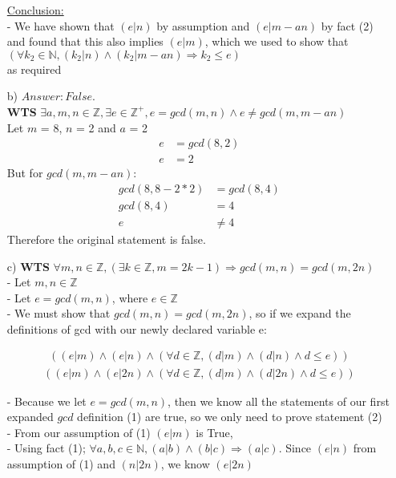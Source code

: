 \documentclass[20pt]{article}
\begin{document}
\begin{enumerate}
\underline{Conclusion:}\\
- We have shown that $(e|n)$ by assumption and $(e|m-an)$ by fact (2) and found that this also implies $(e|m)$, which we used to show that $(\forall k_2 \in\mathbb{N}, (k_2|n)\land(k_2|m-an)\Rightarrow k_2 \leq e)$ \\
as required \hfill \Box



\item[b)] $Answer: False.$\\ 
\textbf{WTS} $\exists a,m,n \in\mathbb{Z}, \exists e \in\mathbb{Z}^+, e = gcd(m,n) \land e \neq gcd(m,m-an)$ \\
Let $m$ = 8, $n$ = 2 and $a$ = 2\\
\begin{align}
    e &= gcd(8,2) \nonumber\\
    e &= 2 \nonumber
\end{align}
But for $gcd(m,m-an)$:
\begin{align}
    gcd(8,8-2*2) &= gcd(8,4)\nonumber\\
    gcd(8,4) &= 4 \nonumber\\
    e &\neq 4 \nonumber
\end{align}
Therefore the original statement is false.

\newpage
\item[c)] \textbf{WTS} $\forall m,n \in\mathbb{Z},(\exists k \in\mathbb{Z}, m = 2k-1) \Rightarrow gcd(m,n) = gcd(m,2n)$\\
- Let $m,n \in\mathbb{Z}$\\
- Let $e = gcd(m,n)$, where $e\in\mathbb{Z}$\\
- We must show that $gcd(m,n) = gcd(m,2n)$, so if we expand the definitions of gcd with our newly declared variable e:

\begin{align}
    ((e|m)\land(e|n)\land(\forall d\in\mathbb{Z},(d|m)\land(d|n)\land d\leq e)) \tag{1}
\end{align}
\begin{align}
    ((e|m)\land(e|2n)\land(\forall d\in\mathbb{Z},(d|m)\land(d|2n)\land d\leq e)) \tag{2}
\end{align}

- Because we let $e = gcd(m,n)$, then we know all the statements of our first expanded $gcd$ definition (1) are true, so we only need to prove statement (2)\\
- From our assumption of (1) $(e|m)$ is True, \\
- Using fact (1); $\forall a,b,c \in\mathbb{N}, (a|b)\land(b|c)\Rightarrow(a|c)$. Since $(e|n)$ from assumption of (1) and $(n|2n)$, we know $(e|2n)$\\


\end{enumerate}
\end{document}
